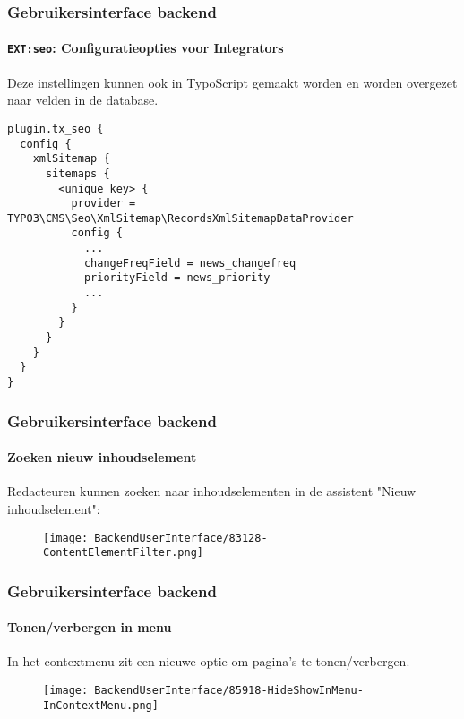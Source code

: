 
\begin{frame}[fragile]
	\frametitle{Gebruikersinterface backend}
	\framesubtitle{\texttt{EXT:seo}: Configuratieopties voor Integrators}

	\lstset{basicstyle=\tiny\ttfamily}

	Deze instellingen kunnen ook in TypoScript gemaakt worden en worden overgezet naar velden
	in de database.

	\begin{lstlisting}
plugin.tx_seo {
  config {
    xmlSitemap {
      sitemaps {
        <unique key> {
          provider = TYPO3\CMS\Seo\XmlSitemap\RecordsXmlSitemapDataProvider
          config {
            ...
            changeFreqField = news_changefreq
            priorityField = news_priority
            ...
          }
        }
      }
    }
  }
}
	\end{lstlisting}

\end{frame}


\begin{frame}[fragile]
	\frametitle{Gebruikersinterface backend}
	\framesubtitle{Zoeken nieuw inhoudselement}

	Redacteuren kunnen zoeken naar inhoudselementen in de assistent "Nieuw inhoudselement":

	\begin{figure}
		\texttt{[image: BackendUserInterface/83128-ContentElementFilter.png]}
	\end{figure}

\end{frame}


\begin{frame}[fragile]
	\frametitle{Gebruikersinterface backend}
	\framesubtitle{Tonen/verbergen in menu}

	In het contextmenu zit een nieuwe optie om pagina's te tonen/verbergen.

	\begin{figure}
		\texttt{[image: BackendUserInterface/85918-HideShowInMenu-InContextMenu.png]}
	\end{figure}

\end{frame}

